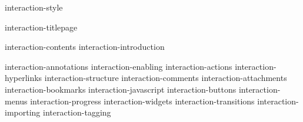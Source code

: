 \environment interaction-style

\startdocument

    \component interaction-titlepage

    \startfrontmatter
        \component interaction-contents
        \component interaction-introduction
    \stopfrontmatter

    \startbodymatter
        \component interaction-annotations
        \component interaction-enabling
        \component interaction-actions
            \component interaction-hyperlinks
            \component interaction-structure
        \component interaction-comments
        \component interaction-attachments
            \component interaction-bookmarks
        \component interaction-javascript
            \component interaction-buttons
            \component interaction-menus
            \component interaction-progress
            \component interaction-widgets
            \component interaction-transitions
            \component interaction-importing
            \component interaction-tagging
    \stopbodymatter

\stopdocument
